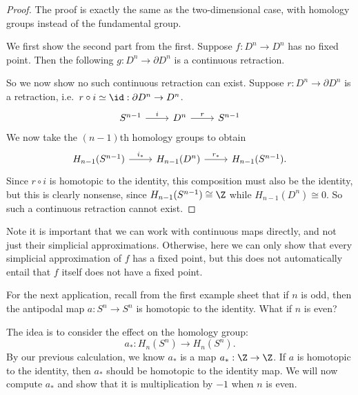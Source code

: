 \documentclass[a4paper]{article}
\begin{document}
\begin{proof}
  The proof is exactly the same as the two-dimensional case, with homology groups instead of the fundamental group.

  We first show the second part from the first. Suppose $f: D^n \to D^n$ has no fixed point. Then the following $g: D^n \to \partial D^n$ is a continuous retraction.
  \begin{center}
  \end{center}
  So we now show no such continuous retraction can exist. Suppose $r: D^n \to \partial D^n$ is a retraction, i.e.\ $r \circ i \simeq \id: \partial D^n \to D^n$.
  \[
    \begin{tikzcd}
      S^{n - 1} \ar[r, "i"] & D^n \ar[r, "r"] & S^{n - 1}
    \end{tikzcd}
  \]
  We now take the $(n - 1)$th homology groups to obtain
  \[
    \begin{tikzcd}
      H_{n - 1}(S^{n - 1}) \ar[r, "i_*"] & H_{n - 1}(D^{n}) \ar[r, "r_*"] & H_{n - 1}(S^{n - 1}).
    \end{tikzcd}
  \]
  Since $r \circ i$ is homotopic to the identity, this composition must also be the identity, but this is clearly nonsense, since $H_{n - 1}(S^{n - 1}) \cong \Z$ while $H_{n - 1}(D^n) \cong 0$. So such a continuous retraction cannot exist.
\end{proof}
Note it is important that we can work with continuous maps directly, and not just their simplicial approximations. Otherwise, here we can only show that every simplicial approximation of $f$ has a fixed point, but this does not automatically entail that $f$ itself does not have a fixed point.

For the next application, recall from the first example sheet that if $n$ is odd, then the antipodal map $a: S^n \to S^n$ is homotopic to the identity. What if $n$ is even?

The idea is to consider the effect on the homology group:
\[
  a_*: H_n(S^n) \to H_n(S^n).
\]
By our previous calculation, we know $a_*$ is a map $a_*: \Z \to \Z$. If $a$ is homotopic to the identity, then $a_*$ should be homotopic to the identity map. We will now compute $a_*$ and show that it is multiplication by $-1$ when $n$ is even.
\end{document}

